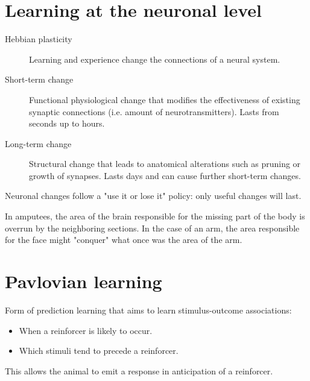 \section{Learning at the neuronal level}

\begin{description}
    \item[Hebbian plasticity] 
        Learning and experience change the connections of a neural system.

    \item[Short-term change] 
        Functional physiological change that modifies the effectiveness of existing synaptic connections (i.e. amount of neurotransmitters).
        Lasts from seconds up to hours.

    \item[Long-term change] 
        Structural change that leads to anatomical alterations such as pruning or growth of synapses.
        Lasts days and can cause further short-term changes.
\end{description}

\begin{remark}
    Neuronal changes follow a "use it or lose it" policy:
    only useful changes will last.
\end{remark}

\begin{example}
    In amputees, the area of the brain responsible for the missing part of the body is overrun by the neighboring sections.
    In the case of an arm, the area responsible for the face might "conquer" what once was the area of the arm.
\end{example}



\section{Pavlovian learning}

Form of prediction learning that aims to learn stimulus-outcome associations:
\begin{itemize}
    \item When a reinforcer is likely to occur.
    \item Which stimuli tend to precede a reinforcer.
\end{itemize}
This allows the animal to emit a response in anticipation of a reinforcer.

